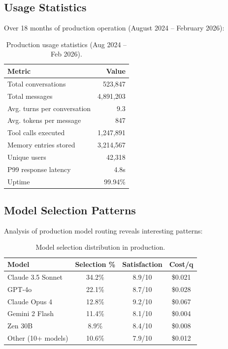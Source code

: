 \documentclass[11pt,twocolumn]{article}
\begin{document}
\subsection{Usage Statistics}

Over 18 months of production operation (August 2024 -- February 2026):

\begin{table}[H]
\centering
\begin{tabular}{lr}
\toprule
\textbf{Metric} & \textbf{Value} \\
\midrule
Total conversations & 523,847 \\
Total messages & 4,891,203 \\
Avg. turns per conversation & 9.3 \\
Avg. tokens per message & 847 \\
Tool calls executed & 1,247,891 \\
Memory entries stored & 3,214,567 \\
Unique users & 42,318 \\
P99 response latency & 4.8s \\
Uptime & 99.94\% \\
\bottomrule
\end{tabular}
\caption{Production usage statistics (Aug 2024 -- Feb 2026).}
\label{tab:production}
\end{table}

\subsection{Model Selection Patterns}

Analysis of production model routing reveals interesting patterns:

\begin{table}[H]
\centering
\small
\begin{tabular}{lccc}
\toprule
\textbf{Model} & \textbf{Selection \%} & \textbf{Satisfaction} & \textbf{Cost/q} \\
\midrule
Claude 3.5 Sonnet & 34.2\% & 8.9/10 & \$0.021 \\
GPT-4o & 22.1\% & 8.7/10 & \$0.028 \\
Claude Opus 4 & 12.8\% & 9.2/10 & \$0.067 \\
Gemini 2 Flash & 11.4\% & 8.1/10 & \$0.004 \\
Zen 30B & 8.9\% & 8.4/10 & \$0.008 \\
Other (10+ models) & 10.6\% & 7.9/10 & \$0.012 \\
\bottomrule
\end{tabular}
\caption{Model selection distribution in production.}
\label{tab:model_selection}
\end{table}
\end{document}
